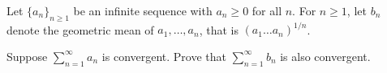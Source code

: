 Let $\lbrace a_n \rbrace_{n \ge 1}$ be an infinite sequence with $a_n \ge 0$
for all $n$.  For $n \ge 1$, let $b_n$ denote the geometric mean of $a_1,
\dots, a_n$, that is $(a_1 \dots a_n)^{1/n}$.

Suppose $\displaystyle{\sum_{n=1}^{\infty} a_n}$ is convergent. Prove that
$\displaystyle{\sum_{n=1}^{\infty} b_n}$ is also convergent.
